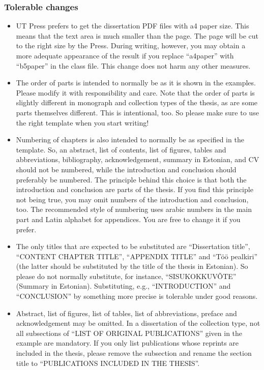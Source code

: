 \subsubsection{Tolerable changes}

\begin{itemize}
\item UT Press prefers to get the dissertation PDF files with a4 paper size. This means that the text area is much smaller than the page. The page will be cut to the right size by the Press. During writing, however, you may obtain a more adequate appearance of the result if you replace “a4paper” with “b5paper” in the class file. This change does not harm any other measures.
\item The order of parts is intended to normally be as it is shown in the examples. Please modify it with responsibility and care. Note that the order of parts is slightly different in monograph and collection types of the thesis, as are some parts themselves different. This is intentional, too. So please make sure to use the right template when you start writing!
\item Numbering of chapters is also intended to normally be as specified in the template. So, an abstract, list of contents, list of figures, tables and abbreviations, bibliography, acknowledgement, summary in Estonian, and CV should not be numbered, while the introduction and conclusion should preferably be numbered. The principle behind this choice is that both the introduction and conclusion are parts of the thesis. If you find this principle not being true, you may omit numbers of the introduction and conclusion, too. The recommended style of numbering uses arabic numbers in the main part and Latin alphabet for appendices. You are free to change it if you prefer.
\item The only titles that are expected to be substituted are “Dissertation title”, “CONTENT CHAPTER TITLE”, “APPENDIX TITLE” and “Töö pealkiri” (the latter should be substituted by the title of the thesis in Estonian). So please do not normally substitute, for instance, “SISUKOKKUVÕTE” (Summary in Estonian). Substituting, e.g., “INTRODUCTION” and “CONCLUSION” by something more precise is tolerable under good reasons.
\item Abstract, list of figures, list of tables, list of abbreviations, preface and acknowledgement may be omitted. In a dissertation of the collection type, not all subsections of “LIST OF ORIGINAL PUBLICATIONS” given in the example are mandatory. If you only list publications whose reprints are included in the thesis, please remove the subsection and rename the section title to “PUBLICATIONS INCLUDED IN THE THESIS”.

\end{itemize}
